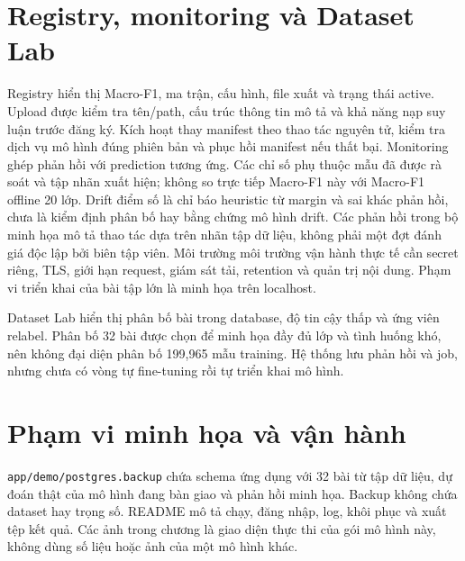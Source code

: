 \section{Registry, monitoring và Dataset Lab}
Registry hiển thị Macro-F1, ma trận, cấu hình, file xuất và trạng thái active. Upload được kiểm tra tên/path, cấu trúc thông tin mô tả và khả năng nạp suy luận trước đăng ký. Kích hoạt thay manifest theo thao tác nguyên tử, kiểm tra dịch vụ mô hình đúng phiên bản và phục hồi manifest nếu thất bại.
\ActivationDiagram
{}
Monitoring ghép phản hồi với prediction tương ứng. Các chỉ số phụ thuộc mẫu đã được rà soát và tập nhãn xuất hiện; không so trực tiếp Macro-F1 này với Macro-F1 offline 20 lớp. Drift điểm số là chỉ báo heuristic từ margin và sai khác phản hồi, chưa là kiểm định phân bố hay bằng chứng mô hình drift. Các phản hồi trong bộ minh họa mô tả thao tác dựa trên nhãn tập dữ liệu, không phải một đợt đánh giá độc lập bởi biên tập viên.
Môi trường môi trường vận hành thực tế cần secret riêng, TLS, giới hạn request, giám sát tải, retention và quản trị nội dung. Phạm vi triển khai của bài tập lớn là minh họa trên localhost.

Dataset Lab hiển thị phân bố bài trong database, độ tin cậy thấp và ứng viên relabel. Phân bố 32 bài được chọn để minh họa đầy đủ lớp và tình huống khó, nên không đại diện phân bố 199,965 mẫu training. Hệ thống lưu phản hồi và job, nhưng chưa có vòng tự fine-tuning rồi tự triển khai mô hình.

\section{Phạm vi minh họa và vận hành}
\texttt{app/demo/postgres.backup} chứa schema ứng dụng với 32 bài từ tập dữ liệu, dự đoán thật của mô hình đang bàn giao và phản hồi minh họa. Backup không chứa dataset hay trọng số. README mô tả chạy, đăng nhập, log, khôi phục và xuất tệp kết quả. Các ảnh trong chương là giao diện thực thi của gói mô hình này, không dùng số liệu hoặc ảnh của một mô hình khác.

